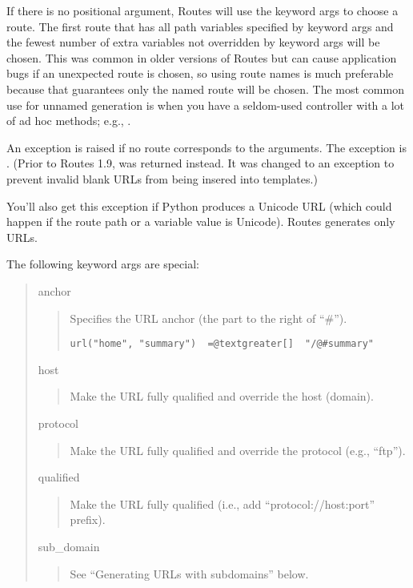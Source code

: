 \documentclass[letterpaper,10pt,english]{manual}
\begin{document}
If there is no positional argument, Routes will use the keyword args to choose
a route.  The first route that has all path variables specified by keyword args
and the fewest number of extra variables not overridden by keyword args will be
chosen.  This was common in older versions of Routes but can cause application
bugs if an unexpected route is chosen, so using route names is much preferable
because that guarantees only the named route will be chosen.  The most common
use for unnamed generation is when you have a seldom-used controller with a lot
of ad hoc methods; e.g., .

An exception is raised if no route corresponds to the arguments.  The exception
is .  (Prior to Routes 1.9,  was
returned instead.  It was changed to an exception to prevent invalid blank URLs
from being insered into templates.)

You'll also get this exception if Python produces a Unicode URL (which could
happen if the route path or a variable value is Unicode).  Routes generates
only  URLs.

The following keyword args are special:
\begin{quote}

anchor
\begin{quote}

Specifies the URL anchor (the part to the right of ``\#'').

\begin{Verbatim}[commandchars=@\[\]]
url("home", "summary")  =@textgreater[]  "/@#summary"
\end{Verbatim}
\end{quote}

host
\begin{quote}

Make the URL fully qualified and override the host (domain).
\end{quote}

protocol
\begin{quote}

Make the URL fully qualified and override the protocol (e.g., ``ftp'').
\end{quote}

qualified
\begin{quote}

Make the URL fully qualified (i.e., add ``protocol://host:port'' prefix).
\end{quote}

sub\_domain
\begin{quote}

See ``Generating URLs with subdomains'' below.
\end{quote}
\end{quote}
\end{document}
